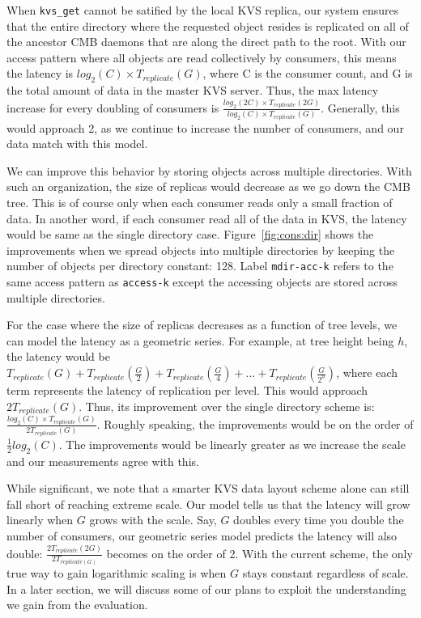 When {\tt kvs\_get} cannot be satified by the local KVS replica,
our system ensures that the entire directory where
the requested object resides is replicated on
all of the ancestor CMB daemons that are along the direct path 
to the root. With our access pattern where all objects
are read collectively by consumers, this means the latency is 
$log_2(C) \times T_{replicate}(G)$, where C is the consumer count, and G is the 
total amount of data in the master KVS server.
Thus, the max latency increase for every doubling of consumers is 
$\frac{log_2(2C) \times T_{replicate}(2G)}{log_2(C) \times T_{replicate}(G)}$.
Generally, this would approach 2, 
as we continue to increase the number of consumers,
and our data match with this model.

We can improve this behavior by storing objects across multiple
directories. With such an organization, the size of replicas 
would decrease as we go down the CMB tree. This is of course only when
each consumer reads only a small fraction of data. In another
word, if each consumer read all of the data in KVS, the latency
would be same as the single directory case. 
Figure~\ref{fig:cons:dir} shows the improvements 
when we spread objects into multiple directories by
keeping the number of objects per directory constant: 128.
Label {\tt mdir-acc-k} refers to the same access pattern as {\tt access-k} 
except the accessing objects are stored across multiple directories.


For the case where the size of replicas 
decreases as a function of tree levels, 
we can model the latency as a geometric series. For example, at tree height being $h$,
the latency would be 
$T_{replicate}(G) + T_{replicate}(\frac{G}{2}) + T_{replicate}(\frac{G}{4}) + ... + T_{replicate}(\frac{G}{2^h})$, 
where each term represents the latency of replication per level.
This would approach $2T_{replicate}(G)$. Thus, its improvement over the single
directory scheme is: $\frac{log_2(C) \times T_{replicate}(G)}{2 T_{replicate}(G)}$.
Roughly speaking, the improvements would be on the order of 
$\frac{1}{2}log_2(C)$. The improvements would be linearly 
greater as we increase the scale and our measurements agree with this. 

While significant, we note that a smarter KVS data layout scheme alone
can still fall short of reaching extreme scale. Our model tells us that the latency
will grow linearly when $G$ grows with the scale. 
Say, $G$ doubles every time you double the number of consumers, our geometric series
model predicts the latency will also double:
$\frac{2T_{replicate}(2G)}{2T_{replicate(G)}}$ becomes 
on the order of 2. With the current scheme, the only true way to gain logarithmic
scaling is when $G$ stays constant regardless of scale. 
In a later section, we will discuss some of our plans 
to exploit the understanding we gain from the evaluation. 


